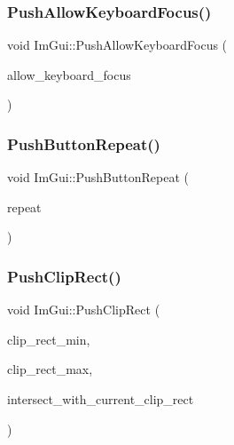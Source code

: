 \subsubsection{\texorpdfstring{Push\+Allow\+Keyboard\+Focus()}{PushAllowKeyboardFocus()}}
{\footnotesize\ttfamily void Im\+Gui\+::\+Push\+Allow\+Keyboard\+Focus (\begin{DoxyParamCaption}\item[{bool}]{allow\+\_\+keyboard\+\_\+focus }\end{DoxyParamCaption})}

\mbox{\label{namespace_im_gui_a61d3e0191d67bedaf45f0178f87e3125}} 
\subsubsection{\texorpdfstring{Push\+Button\+Repeat()}{PushButtonRepeat()}}
{\footnotesize\ttfamily void Im\+Gui\+::\+Push\+Button\+Repeat (\begin{DoxyParamCaption}\item[{bool}]{repeat }\end{DoxyParamCaption})}

\mbox{\label{namespace_im_gui_a11c8bd8676e1281e15b24c9615b6904a}} 
\subsubsection{\texorpdfstring{Push\+Clip\+Rect()}{PushClipRect()}}
{\footnotesize\ttfamily void Im\+Gui\+::\+Push\+Clip\+Rect (\begin{DoxyParamCaption}\item[{const \mbox{\hyperlink{struct_im_vec2}{Im\+Vec2}} \&}]{clip\+\_\+rect\+\_\+min,  }\item[{const \mbox{\hyperlink{struct_im_vec2}{Im\+Vec2}} \&}]{clip\+\_\+rect\+\_\+max,  }\item[{bool}]{intersect\+\_\+with\+\_\+current\+\_\+clip\+\_\+rect }\end{DoxyParamCaption})}

\mbox{\label{namespace_im_gui_abb20c9f8365cab62d9394ebb1dd5d769}} 
